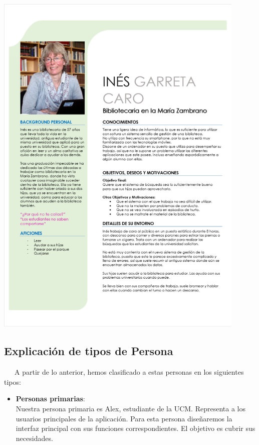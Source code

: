\documentclass[12pt]{article}
\begin{document}
\begin{itemize}
\begin{center}
	\centering
	\includegraphics[width=0.90\textwidth]{fotoInes}
\end{center}

\newpage
\subsection{Explicación de tipos de Persona}

~~~A partir de lo anterior, hemos clasificado a estas personas en los siguientes tipos:

\begin{itemize}
	\item \textbf{Personas primarias}: \\
		Nuestra persona primaria es Alex, estudiante de la UCM. Representa a los usuarios principales de la aplicación. Para esta persona diseñaremos la interfaz principal con sus funciones correspondientes. El objetivo es cubrir sus necesidades.
	

\end{itemize}
\end{itemize}
\end{document}
